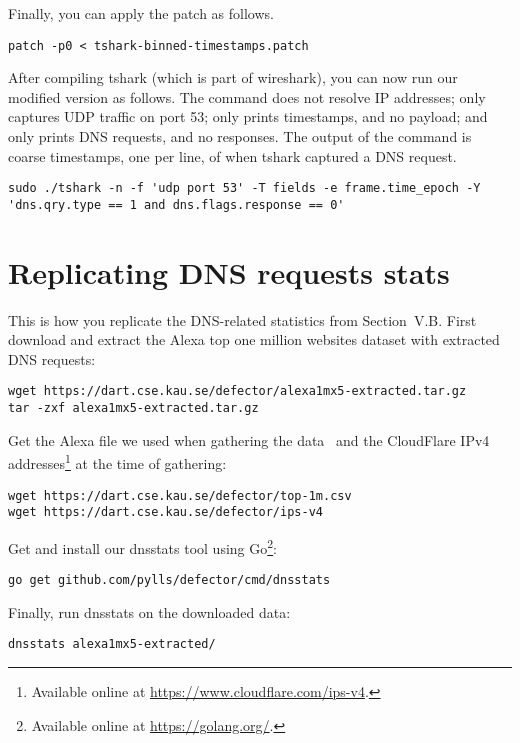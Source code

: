 \documentclass{article}
\begin{document}
Finally, you can apply the patch as follows.

\begin{lstlisting}
patch -p0 < tshark-binned-timestamps.patch
\end{lstlisting}

After compiling tshark (which is part of wireshark), you can now run our
modified version as follows.  The command does not resolve IP addresses; only
captures UDP traffic on port 53; only prints timestamps, and no payload; and
only prints DNS requests, and no responses.  The output of the command is coarse
timestamps, one per line, of when tshark captured a DNS request.

\begin{lstlisting}
sudo ./tshark -n -f 'udp port 53' -T fields -e frame.time_epoch -Y 'dns.qry.type == 1 and dns.flags.response == 0'
\end{lstlisting}

\section{Replicating DNS requests stats}
This is how you replicate the DNS-related statistics from Section~V.B.  First
download and extract the Alexa top one million websites dataset with extracted
DNS requests:

\begin{lstlisting}
wget https://dart.cse.kau.se/defector/alexa1mx5-extracted.tar.gz
tar -zxf alexa1mx5-extracted.tar.gz
\end{lstlisting}

Get the Alexa file we used when gathering the data~\cite{alexatop1k} and the
CloudFlare IPv4 addresses\footnote{Available online at
\url{https://www.cloudflare.com/ips-v4}.} at the time of gathering:

\begin{lstlisting}
wget https://dart.cse.kau.se/defector/top-1m.csv
wget https://dart.cse.kau.se/defector/ips-v4
\end{lstlisting}

Get and install our dnsstats tool using Go\footnote{Available online at
\url{https://golang.org/}.}:

\begin{lstlisting}
go get github.com/pylls/defector/cmd/dnsstats
\end{lstlisting}

Finally, run dnsstats on the downloaded data:

\begin{lstlisting}
dnsstats alexa1mx5-extracted/
\end{lstlisting}
\end{document}
